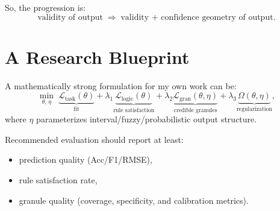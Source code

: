 ﻿\documentclass[11pt,a4paper]{article}
\begin{document}
So, the progression is:
\begin{equation}
\text{validity of output} \;\Rightarrow\; \text{validity + confidence geometry of output}.
\label{eq:progression}
\end{equation}

\section{A Research Blueprint}
A mathematically strong formulation for my own work can be:
\begin{equation}
\min_{\theta,\,\eta}\;
\underbrace{\mathcal{L}_{\text{task}}(\theta)}_{\text{fit}}
+ \lambda_1\underbrace{\mathcal{L}_{\text{logic}}(\theta)}_{\text{rule satisfaction}}
+ \lambda_2\underbrace{\mathcal{L}_{\text{gran}}(\theta,\eta)}_{\text{credible granules}}
+ \lambda_3\underbrace{\Omega(\theta,\eta)}_{\text{regularization}},
\label{eq:blueprint}
\end{equation}
where $\eta$ parameterizes interval/fuzzy/probabilistic output structure.

Recommended evaluation should report at least:
\begin{itemize}
\item prediction quality (Acc/F1/RMSE),
\item rule satisfaction rate,
\item granule quality (coverage, specificity, and calibration metrics).
\end{itemize}
\end{document}
